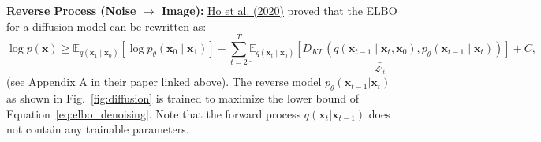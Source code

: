 \documentclass[11pt,addpoints,answers]{exam}
\newcommand{\xv}{\mathbf{x}}
\begin{document}
\begin{questions}
    \textbf{Reverse Process (Noise $\rightarrow$ Image):} \href{https://arxiv.org/pdf/2006.11239.pdf}{Ho et al. (2020)} proved that the ELBO for a diffusion model can be rewritten as:
    \begin{equation}
        \log p(\xv) \ge \mathbb{E}_{q(\xv_1 \mid \xv_0)}[\log p_\theta (\xv_0 \mid \xv_1) ] - \sum_{t=2}^{T} \underbrace{\mathbb{E}_{q( \xv_t \mid \xv_0)}\left[D_{KL} \left(q(\xv_{t-1} \mid \xv_{t}, \xv_{0}), p_\theta(\xv_{t-1} \mid \xv_{t})\right)\right]}_{\mathcal{L'}_t}+ C,
        \label{eq:elbo_denoising}
    \end{equation}
    (see Appendix A in their paper linked above). The reverse model $p_\theta(\xv_{t-1}|\xv_t)$ as shown in Fig.~\ref{fig:diffusion} is trained to maximize the lower bound of Equation~\ref{eq:elbo_denoising}.
    Note that the forward process $q(\xv_t | \xv_{t-1})$  does not contain any trainable parameters.
    

\end{questions}
\end{document}
